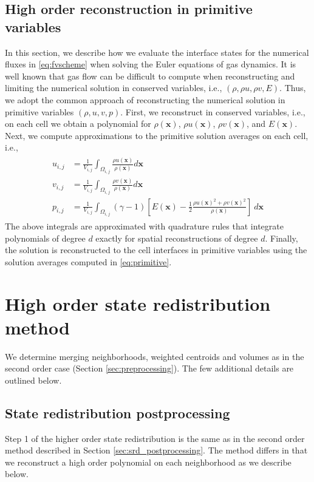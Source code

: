 \subsection{High order reconstruction in primitive variables} \label{sec:ho_reconstruction_primitive}
In this section, we describe how we evaluate the interface states for the numerical fluxes in \eqref{eq:fvscheme} when solving the Euler equations of gas dynamics.  It is well known that gas flow can be difficult to compute when reconstructing and limiting the numerical solution in conserved variables, i.e., $(\rho, \rho u, \rho v, E)$.  Thus, we adopt the common approach of reconstructing the numerical solution in primitive variables $(\rho, u, v, p)$.  First, we reconstruct in conserved variables, i.e., on each cell we obtain a polynomial 
for $\rho(\mathbf{x})$, $\rho u(\mathbf{x})$, $\rho v(\mathbf{x})$, and $E(\mathbf{x})$.  Next, we compute approximations to the primitive solution averages on each cell, i.e.,
\begin{align} 
\begin{aligned}
u_{i,j} &= \frac{1}{V_{i,j}} \int_{\Omega_{i,j}} \frac{\rho u(\mathbf{x})}{\rho(\mathbf{x})} d\mathbf{x} \\
v_{i,j} &= \frac{1}{V_{i,j}} \int_{\Omega_{i,j}} \frac{\rho v(\mathbf{x})}{\rho(\mathbf{x})} d\mathbf{x} \\
p_{i,j} &= \frac{1}{V_{i,j}}\int_{\Omega_{i,j}} (\gamma-1) \left[E(\mathbf{x}) - \frac{1}{2}\frac{\rho u(\mathbf{x})^2+\rho v(\mathbf{x})^2}{\rho(\mathbf{x})} \right] ~d\mathbf{x}
\end{aligned}\label{eq:primitive}
\end{align}
The above integrals are approximated with quadrature rules that integrate polynomials
of degree $d$ exactly for spatial reconstructions of degree $d$.
Finally, the solution is reconstructed to the cell interfaces in 
primitive variables using the solution averages 
computed in \eqref{eq:primitive}.  

\section{High order state redistribution method} \label{sec:ho_reconstruction_q}


We determine merging neighborhoods, weighted centroids and volumes as in the second order case (Section \ref{sec:preprocessing}).  The few additional details are outlined below.

\subsection{State redistribution postprocessing} \label{sec:postprocessing_ho}
Step 1 of the higher order state redistribution is the same as in the 
second order method described in Section \ref{sec:srd_postprocessing}.  
The method differs in that we reconstruct a high order polynomial 
on each neighborhood as we describe below.


